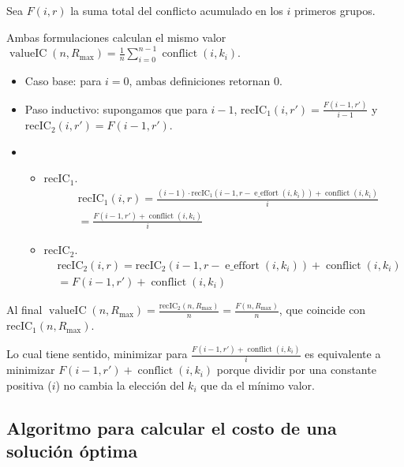 Sea $F(i,r)$ la suma total del conflicto acumulado en los $i$ primeros grupos.

Ambas formulaciones calculan el mismo valor $\operatorname{ valueIC }(n,R_{ \max }) = \frac{ 1 }{ n } \sum_{ i = 0 }^{ n - 1 } \operatorname{ conflict }(i,k_i)$.

\begin{itemize}
	\item Caso base: para $i = 0$, ambas definiciones retornan $0$.
	\item Paso inductivo: supongamos que para $i - 1$, $\operatorname{ { recIC }_1 }(i,r') = \frac{ F(i - 1,r') }{ i - 1 }$ y $\operatorname{ { recIC }_2 }(i,r') =F(i - 1,r')$.
	\item \begin{itemize}
			\item $\operatorname{ { recIC }_1 }$.
			\begin{align}
				& \operatorname{ { recIC }_1 }(i,r) = \frac{ (i - 1) \cdot \operatorname{ { recIC }_1 }(i - 1,r - \operatorname{ e\_effort }(i,k_i)) + \operatorname{ conflict }(i,k_i) }{ i } \\
				& = \frac{ F(i - 1,r') + \operatorname{ conflict }(i,k_i) }{ i }
			\end{align}
			\item $\operatorname{ { recIC }_2 }$.
			\begin{align}
				& \operatorname{ { recIC }_2 }(i,r) = \operatorname{ { recIC }_2 }(i - 1,r - \operatorname{ e\_effort }(i,k_i)) + \operatorname{ conflict }(i,k_i) \\
				& = F(i - 1,r') + \operatorname{ conflict }(i,k_i)
			\end{align}
		\end{itemize}
\end{itemize}

Al final $\operatorname{ valueIC }(n,R_{ \max }) = \frac{ \operatorname{ { recIC }_2 }(n,R_{ \max }) }{ n } = \frac{ F(n,R_{ \max }) }{ n }$, que coincide con $\operatorname{ { recIC }_1 }(n,R_{ \max })$.

Lo cual tiene sentido, minimizar para $\frac{ F(i - 1,r') + \operatorname{ conflict }(i,k_i) }{ i }$ es equivalente a minimizar $F(i - 1,r') + \operatorname{ conflict }(i,k_i)$ porque dividir por una constante positiva ($i$) no cambia la elección del $k_i$ que da el mínimo valor.

\subsection{Algoritmo para calcular el costo de una solución óptima}

